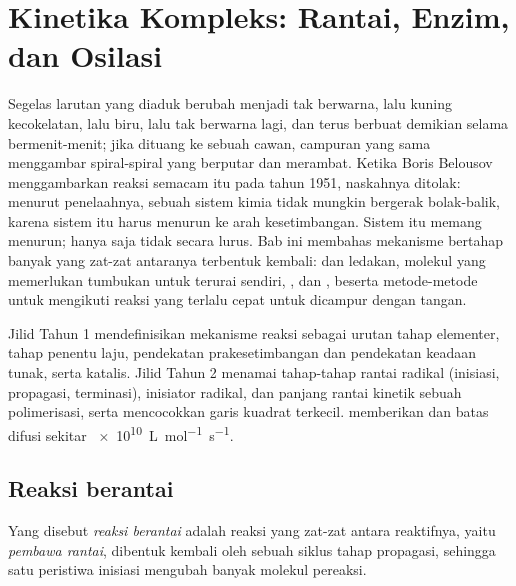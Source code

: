 \chapter{Kinetika Kompleks: Rantai, Enzim, dan Osilasi}\label{ch:b3:complex-kinetics}

Segelas larutan yang diaduk berubah menjadi tak berwarna, lalu kuning
kecokelatan, lalu biru, lalu tak berwarna lagi, dan terus berbuat demikian
selama bermenit-menit; jika dituang ke sebuah cawan, campuran yang sama
menggambar spiral-spiral yang berputar dan merambat. Ketika Boris Belousov
menggambarkan reaksi semacam itu pada tahun 1951, naskahnya ditolak: menurut
penelaahnya, sebuah sistem kimia tidak mungkin bergerak bolak-balik, karena
sistem itu harus menurun ke arah kesetimbangan. Sistem itu memang menurun;
hanya saja tidak secara lurus. Bab ini membahas mekanisme bertahap banyak
yang zat-zat antaranya terbentuk kembali:  dan ledakan,
molekul yang memerlukan tumbukan untuk terurai sendiri, , dan
, beserta metode-metode untuk mengikuti reaksi yang
terlalu cepat untuk dicampur dengan tangan.

\begin{recall}
Jilid Tahun 1 mendefinisikan mekanisme reaksi sebagai urutan tahap elementer,
tahap penentu laju, pendekatan prakesetimbangan dan pendekatan keadaan
tunak, serta katalis. Jilid Tahun 2 menamai tahap-tahap rantai radikal
(inisiasi, propagasi, terminasi), inisiator radikal, dan panjang rantai
kinetik sebuah polimerisasi, serta mencocokkan garis kuadrat terkecil.
 memberikan  dan batas difusi
sekitar \qty{e10}{L.mol^{-1}.s^{-1}}.
\end{recall}

\section{Reaksi berantai}

\begin{definition}\label{def:b3:complex-kinetics:chain}
Yang disebut \emph{reaksi berantai} adalah reaksi yang
zat-zat antara reaktifnya, yaitu \emph{pembawa rantai},
dibentuk kembali oleh sebuah siklus tahap propagasi, sehingga satu peristiwa
inisiasi mengubah banyak molekul pereaksi.
\end{definition}

